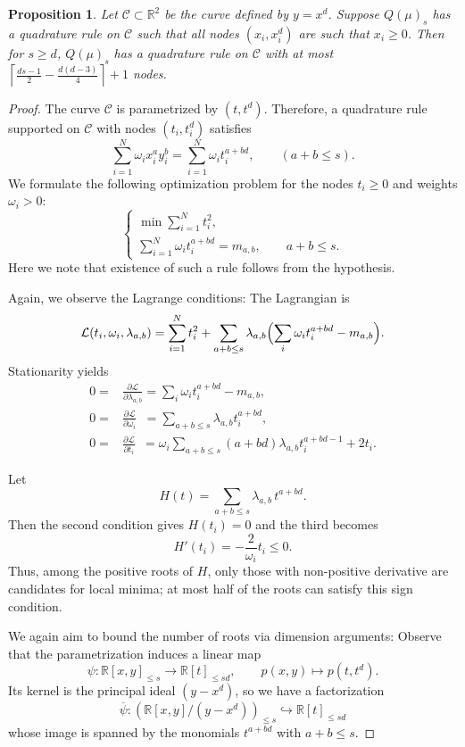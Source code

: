 \documentclass[11pt,a4paper]{amsart}
\numberwithin{equation}{section}
\newtheorem{prop}[thm]{Proposition}
\theoremstyle{definition}
\newcommand{\R}{\mathbb{R}}
\numberwithin{thm}{section}
\theoremstyle{break}
\numberwithin{subcase}{case}
\begin{document}
\begin{prop}\label{prop:ttd}
     Let $\mathcal C\subset \R^2$ be the curve defined by $y=x^d$. {Suppose $Q(\mu)_s$ has a quadrature rule on $\mathcal C$ such that all nodes $(x_i,x_i^d)$ are such that $x_i\geq 0$}. Then for $s\geq d$, $Q(\mu)_s$ has a quadrature rule on $\mathcal C$ with at most $\left\lceil \frac{ds-1}{2}-\frac{d(d-3)}{4} \right\rceil+1$ nodes.
 \end{prop}
 \begin{proof}

The curve $\mathcal C$ is parametrized by $(t,t^d)$.  
Therefore, a quadrature rule supported on $\mathcal C$ with nodes $(t_i,t_i^d)$ satisfies
\[
\sum_{i=1}^N \omega_i x_i^a y_i^b = \sum_{i=1}^N \omega_i t_i^{a+bd},
\qquad (a+b \le s).
\]
We formulate the following optimization problem for the nodes $t_i \ge 0$ and weights $\omega_i > 0$:
\[
\begin{cases}
\min \sum_{i=1}^N t_i^2,\\[2pt]
\sum_{i=1}^N \omega_i t_i^{a+bd} = m_{a,b}, \qquad a+b \le s.
\end{cases}
\]
Here we note that  existence of such a rule follows from the hypothesis.

Again, we observe the Lagrange conditions: 
The Lagrangian is  
\[
\mathcal L(t_i,\omega_i,\lambda_{a,b})
= \sum_{i=1}^N t_i^2
+ \sum_{a+b \le s} \lambda_{a,b}\Bigl(\sum_i \omega_i t_i^{a+bd} - m_{a,b}\Bigr).
\]
Stationarity yields
\begin{align*}
0=&\frac{\partial \mathcal L}{\partial \lambda_{a,b}} = \sum_i \omega_i t_i^{a+bd}-m_{a,b},\\
0=&\frac{\partial \mathcal L}{\partial \omega_i}\phantom{a} = \sum_{a+b\le s} \lambda_{a,b}t_i^{a+bd},\\
0=&\frac{\partial \mathcal L}{\partial t_i}\phantom{a} = \omega_i\sum_{a+b\le s}(a+bd)\lambda_{a,b}t_i^{a+bd-1}+2t_i.
\end{align*}

Let  
\[
H(t) = \sum_{a+b\le s} \lambda_{a,b}\, t^{a+bd}.
\]
Then the second condition gives $H(t_i)=0$ and the third becomes
\[
H'(t_i) = -\frac{2}{\omega_i} t_i \le 0.
\]
Thus, among the positive roots of $H$, only those with non-positive derivative are candidates for local minima; at most half of the roots can satisfy this sign condition.

We again aim to bound the number of roots via dimension arguments:  Observe that the parametrization induces a linear map
\[
\psi:\R[x,y]_{\le s} \longrightarrow \R[t]_{\le sd},
\qquad p(x,y)\longmapsto p(t,t^d).
\]
Its kernel is the principal ideal $(y-x^d)$, so we have a factorization  
\[
\overline{\psi}:(\R[x,y]/(y-x^d))_{\le s} \hookrightarrow \R[t]_{\le sd}
\]
whose image is spanned by the monomials $t^{a+bd}$ with $a+b \le s$.  


\end{proof}
\end{document}
